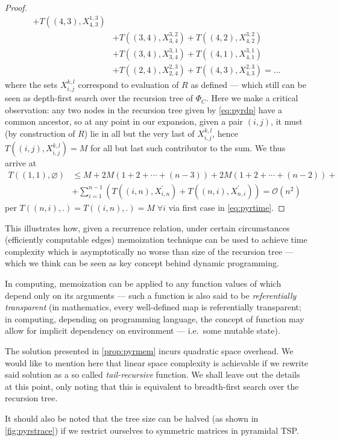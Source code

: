 \documentclass[titlepage,twoside,index=totoc,bibliography=totoc]{scrartcl}
\newcommand{\annotation}[1]{\marginpar{\small\itshape\color{green}#1}}
\numberwithin{equation}{section}
\numberwithin{figure}{section}
\numberwithin{table}{section}
\let\defstyle\itshape
\begin{document}
\begin{proof}
\begin{align*}
         + T\left((4,3),X_{4,3}^{1,3}\right)
    \\ & + T\left((3,4),X_{3,4}^{3,2}\right)
         + T\left((4,2),X_{4,2}^{3,2}\right)
    \\ & + T\left((3,4),X_{3,4}^{3,1}\right)
         + T\left((4,1),X_{4,1}^{3,1}\right)
    \\ & + T\left((2,4),X_{2,4}^{2,3}\right)
         + T\left((4,3),X_{4,3}^{2,3}\right) = \ldots
  \end{align*}
  where the sets $X_{i,j}^{k,l}$ correspond to evaluation of $R$ as defined ---
  which still can be seen as depth-first search over the recursion tree of $\Phi_C$.
  Here we make a critical observation:
  any two nodes in the recursion tree given by \cref{eq:pyrdp} have a common ancestor,
  so at any point in our expansion,
  given a pair $(i,j)$, it must (by construction of $R$)
  lie in all but the very last of $X_{i,j}^{k,l}$,
  hence $T\left((i,j),X_{i,j}^{k,l}\right) = M$ for all but last such contributor to the sum.
  We thus arrive at
  \begin{align*}
    T\left((1,1),\varnothing\right) & \leq
    M + 2M \left(1 + 2 + \cdots + (n-3)\right) +
        2M \left(1 + 2 + \cdots + (n-2)\right) +
    \\
    & + \sum_{i=1}^{n-1} \left(
        T\left((i,n),X_{i,n}^\prime\right)
      + T\left((n,i),X_{n,i}^\prime\right)
    \right)
    = \mathcal{O}\left(n^2\right)
  \end{align*}
  per $T\left((n,i),.\right) = T\left((i,n),.\right) = M \; \forall i$
  via first case in \eqref{eq:pyrtime}.
\end{proof}

This illustrates how, given a recurrence relation, under certain
circumstances (efficiently computable edges) memoization technique can
be used to achieve time complexity which is asymptotically no worse than
size of the recursion tree --- which we think can be seen as key concept
behind dynamic programming.

In computing, memoization can be applied to any function values of which
depend only on its arguments --- such a function is also said to be
{\defstyle referentially transparent} (in mathematics, every well-defined
map is referentially transparent; in computing, depending on programming
language, the concept of function may allow for implicit dependency on
environment --- i.e.\ some mutable state).

\begin{remark}
  The solution presented in \cref{prop:pyrmem} incurs quadratic space
  overhead.  We would like to mention here that linear space complexity is
  achievable if we rewrite said solution as a so called {\defstyle
    tail-recursive} function.  We shall leave out the details at this
  point, only noting that this is equivalent to breadth-first search over
  the recursion tree.

  It should also be noted that the tree size can be halved 
  (as shown in \cref{fig:pyrstrace})
  if we restrict ourselves to symmetric matrices in pyramidal TSP.
\end{remark}
\end{document}
